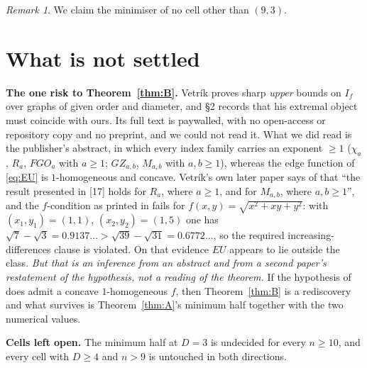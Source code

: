 \documentclass[11pt]{amsart}
\theoremstyle{remark}
\newtheorem{remark}[theorem]{Remark}
\newcommand{\EU}{\mathit{EU}}
\begin{document}
\begin{remark}
We claim the minimiser of no cell other than $(9,3)$.
\end{remark}

\section{What is not settled}\label{sec:open}

\noindent\textbf{The one risk to Theorem~\ref{thm:B}.} Vetr\'ik \cite{Vetrik}
proves sharp \emph{upper} bounds on $I_f$ over graphs of given order and
diameter, and \S2 records that his extremal object must coincide with ours. Its
full text is paywalled, with no open-access or repository copy and no preprint,
and we could not read it. What we did read is the publisher's abstract, in which
every index family carries an exponent $\ge1$ ($\chi_a$, $R_a$, $FGO_a$ with
$a\ge1$; $GZ_{a,b}$, $M_{a,b}$ with $a,b\ge1$), whereas the edge function of
\eqref{eq:EU} is $1$-homogeneous and concave. Vetr\'ik's own later paper
\cite{VetrikJAMC} says of \cite{Vetrik} that ``the result presented in [17]
holds for $R_a$, where $a\ge1$, and for $M_{a,b}$, where $a,b\ge1$'', and the
$f$-condition as printed in \cite{VetrikDML} fails for
$f(x,y)=\sqrt{x^2+xy+y^2}$: with $(x_1,y_1)=(1,1)$, $(x_2,y_2)=(1,5)$ one has
$\sqrt7-\sqrt3=0.9137\ldots>\sqrt{39}-\sqrt{31}=0.6772\ldots$, so the required
increasing-differences clause is violated. On that evidence $\EU$ appears to lie
outside the class. \emph{But that is an inference from an abstract and from a
second paper's restatement of the hypothesis, not a reading of the theorem.} If
the hypothesis of \cite{Vetrik} does admit a concave $1$-homogeneous $f$, then
Theorem~\ref{thm:B} is a rediscovery and what survives is
Theorem~\ref{thm:A}'s minimum half together with the two numerical values.

\medskip
\noindent\textbf{Cells left open.} The minimum half at $D=3$ is undecided for
every $n\ge10$, and every cell with $D\ge4$ and $n>9$ is untouched in both
directions.
\end{document}
